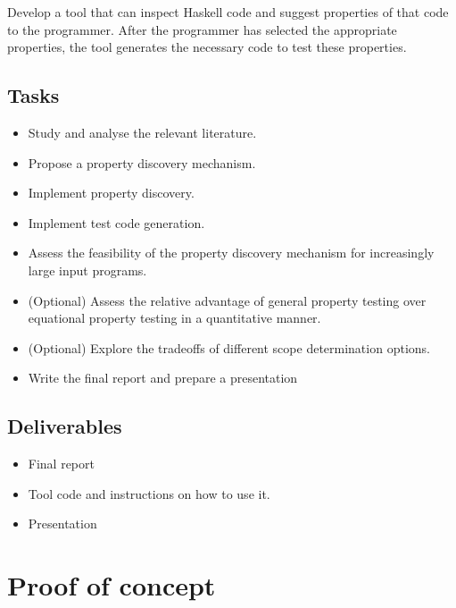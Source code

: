 \documentclass[a4paper, 11pt, onepage]{article}
\begin{document}
Develop a tool that can inspect Haskell code and suggest properties of that code to the programmer.
After the programmer has selected the appropriate properties, the tool generates the necessary code to test these properties.


\subsection{Tasks}

\begin{itemize}
  \item Study and analyse the relevant literature.
  \item Propose a property discovery mechanism.
  \item Implement property discovery.
  \item Implement test code generation.
  \item Assess the feasibility of the property discovery mechanism for increasingly large input programs.
  \item (Optional) Assess the relative advantage of general property testing over equational property testing in a quantitative manner.
  \item (Optional) Explore the tradeoffs of different scope determination options.
  \item Write the final report and prepare a presentation
\end{itemize}


\subsection{Deliverables}

\begin{itemize}
  \item Final report
  \item Tool code and instructions on how to use it.
  \item Presentation
\end{itemize}





\newpage
\appendix

\section{Proof of concept}

\label{app:poc}
\inputminted{Haskell}{poc.hs}
\end{document}

